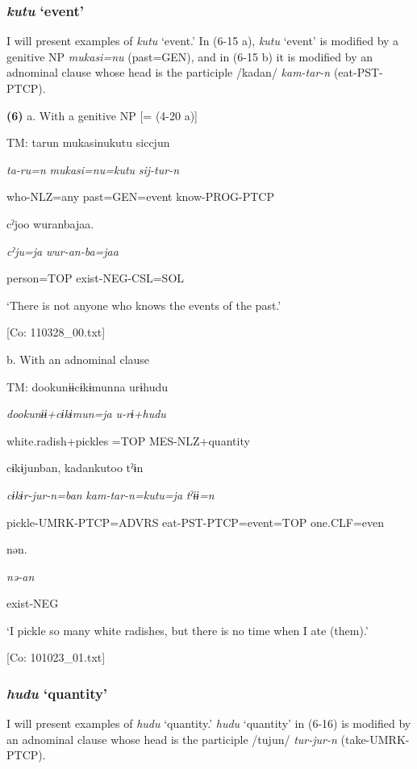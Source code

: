\subsubsection{\textit{kutu} ‘event’}

I will present examples of \textit{kutu} ‘event.’ In (6-15 a), \textit{kutu} ‘event’ is modified by a genitive NP \textit{mukasi=nu} (past=GEN), and in (6-15 b) it is modified by an adnominal clause whose head is the participle /kadan/ \textit{kam-tar-n} (eat-PST-PTCP).

\textbf{(6)}  a.  With a genitive NP [= (4-20 a)]

    TM:  tarun  mukasinukutu  siccjun

      \textit{ta-ru=n}  \textit{mukasi=nu=kutu}  \textit{sij-tur-n}

      who-NLZ=any  past=GEN=event  know-PROG-PTCP

      cˀjoo  wuranbajaa.

      \textit{cˀju=ja}  \textit{wur-an-ba=jaa}

      person=TOP  exist-NEG-CSL=SOL

      ‘There is not anyone who knows the events of the past.’

      [Co: 110328\_00.txt]

  b.  With an adnominal clause

    TM:  dookunɨɨcɨkɨmunna  urɨhudu

      \textit{dookunɨɨ+cɨkɨmun=ja}  \textit{u-rɨ+hudu}

      white.radish+pickles =TOP  MES-NLZ+quantity

      cɨkɨjunban,  kadankutoo  tˀɨn

      \textit{cɨkɨr-jur-n=ban}  \textit{kam-tar-n=kutu=ja}  \textit{tˀɨɨ=n}

      pickle-UMRK-PTCP=ADVRS  eat-PST-PTCP=event=TOP  one.CLF=even

      nən.

      \textit{nə-an}

      exist-NEG

      ‘I pickle so many white radishes, but there is no time when I ate (them).’

      [Co: 101023\_01.txt]

\subsubsection{\textit{hudu} ‘quantity’}

I will present examples of \textit{hudu} ‘quantity.’ \textit{hudu} ‘quantity’ in (6-16) is modified by an adnominal clause whose head is the participle /tujun/ \textit{tur-jur-n} (take-UMRK-PTCP).

